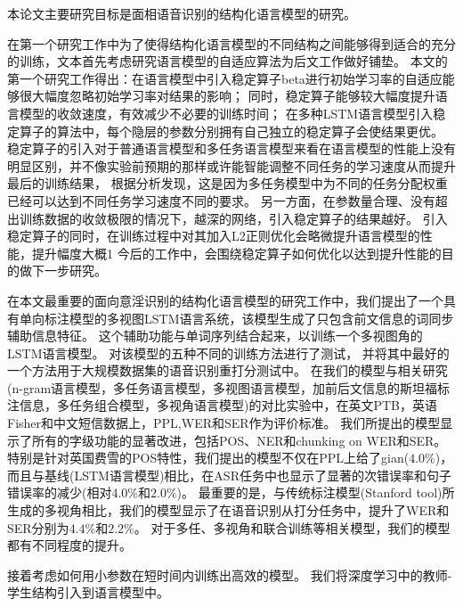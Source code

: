 
\begin{summary}
本论文主要研究目标是面相语音识别的结构化语言模型的研究。

在第一个研究工作中为了使得结构化语言模型的不同结构之间能够得到适合的充分的训练，文本首先考虑研究语言模型的自适应算法为后文工作做好铺垫。
本文的第一个研究工作得出：在语言模型中引入稳定算子beta进行初始学习率的自适应能够很大幅度忽略初始学习率对结果的影响；
同时，稳定算子能够较大幅度提升语言模型的收敛速度，有效减少不必要的训练时间；
在多种LSTM语言模型引入稳定算子的算法中，每个隐层的参数分别拥有自己独立的稳定算子会使结果更优。
稳定算子的引入对于普通语言模型和多任务语言模型来看在语言模型的性能上没有明显区别，并不像实验前预期的那样或许能智能调整不同任务的学习速度从而提升最后的训练结果，
根据分析发现，这是因为多任务模型中为不同的任务分配权重已经可以达到不同任务学习速度不同的要求。
另一方面，在参数量合理、没有超出训练数据的收敛极限的情况下，越深的网络，引入稳定算子的结果越好。
引入稳定算子的同时，在训练过程中对其加入L2正则优化会略微提升语言模型的性能，提升幅度大概1%
今后的工作中，会围绕稳定算子如何优化以达到提升性能的目的做下一步研究。

在本文最重要的面向意淫识别的结构化语言模型的研究工作中，我们提出了一个具有单向标注模型的多视图LSTM语言系统，该模型生成了只包含前文信息的词同步辅助信息特征。
这个辅助功能与单词序列结合起来，以训练一个多视图角的LSTM语言模型。
对该模型的五种不同的训练方法进行了测试，
并将其中最好的一个方法用于大规模数据集的语音识别重打分测试中。
在我们的模型与相关研究(n-gram语言模型，多任务语言模型，多视图语言模型，加前后文信息的斯坦福标注信息，多任务组合模型，多视角语言模型)的对比实验中，在英文PTB，英语Fisher和中文短信数据上，PPL,WER和SER作为评价标准。
我们所提出的模型显示了所有的字级功能的显著改进，包括POS、NER和chunking on WER和SER。
特别是针对英国费雪的POS特性，我们提出的模型不仅在PPL上给了gian($ 4.0\% $)，而且与基线(LSTM语言模型)相比，在ASR任务中也显示了显著的次错误率和句子错误率的减少(相对$ 4.0\% $和$ 2.0\% $)。
最重要的是，与传统标注模型(Stanford tool)所生成的多视角相比，我们的模型显示了在语音识别从打分任务中，提升了WER和SER分别为$ 4.4\% $和$ 2.2\% $。
对于多任、多视角和联合训练等相关模型，我们的模型都有不同程度的提升。

接着考虑如何用小参数在短时间内训练出高效的模型。
我们将深度学习中的教师-学生结构引入到语言模型中。

\end{summary}
